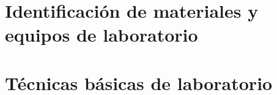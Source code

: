 

\section{Identificación de materiales y equipos de laboratorio}



\section{Técnicas básicas de laboratorio}





\putbib